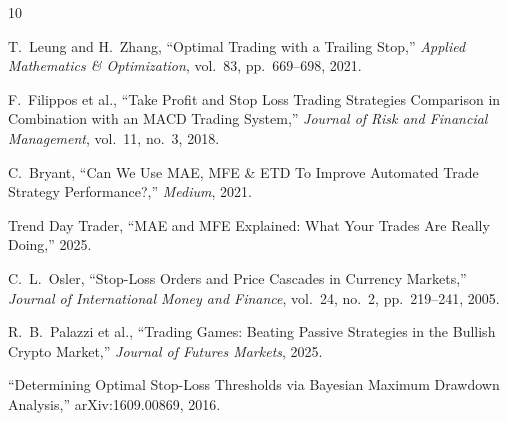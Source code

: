 \documentclass[11pt,a4paper]{article}
\begin{document}
\begin{thebibliography}{10}

T.~Leung and H.~Zhang,
``Optimal Trading with a Trailing Stop,''
\textit{Applied Mathematics \& Optimization}, vol.~83, pp.~669--698, 2021.

F.~Filippos et al.,
``Take Profit and Stop Loss Trading Strategies Comparison in Combination
with an MACD Trading System,''
\textit{Journal of Risk and Financial Management}, vol.~11, no.~3, 2018.

C.~Bryant,
``Can We Use MAE, MFE \& ETD To Improve Automated Trade Strategy Performance?,''
\textit{Medium}, 2021.

Trend Day Trader,
``MAE and MFE Explained: What Your Trades Are Really Doing,''
2025.

C.~L.~Osler,
``Stop-Loss Orders and Price Cascades in Currency Markets,''
\textit{Journal of International Money and Finance}, vol.~24, no.~2,
pp.~219--241, 2005.

R.~B.~Palazzi et al.,
``Trading Games: Beating Passive Strategies in the Bullish Crypto Market,''
\textit{Journal of Futures Markets}, 2025.

``Determining Optimal Stop-Loss Thresholds via Bayesian Maximum Drawdown
Analysis,''
arXiv:1609.00869, 2016.

\end{thebibliography}
\end{document}
